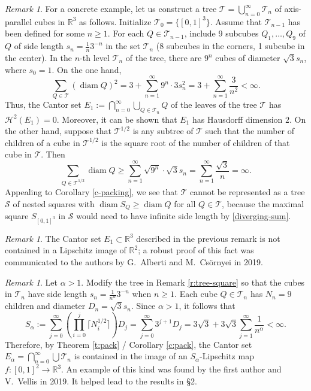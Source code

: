 \documentclass[12pt]{amsart}
\theoremstyle{definition}
\theoremstyle{remark}
\newtheorem{remark}[theorem]{Remark}
\newcommand{\RR}{\mathbb{R}}
\newcommand{\Haus}{\mathcal{H}}
\newcommand{\diam}{\mathop\mathrm{diam}\nolimits}
\numberwithin{figure}{section}
\numberwithin{equation}{section}
\begin{document}
\begin{remark}
For a concrete example, let us construct a tree $\mathcal{T}=\bigcup_{n=0}^\infty\mathcal{T}_n$ of axis-parallel cubes in $\RR^3$ as follows. Initialize $\mathcal{T}_0=\{[0,1]^3\}$. Assume that $\mathcal{T}_{n-1}$ has been defined for some $n\geq 1$. For each $Q\in\mathcal{T}_{n-1}$, include 9 subcubes $Q_1,\dots, Q_9$ of $Q$ of side length $s_n=\frac{1}{n}3^{-n}$ in the set $\mathcal{T}_n$ (8 subcubes in the corners, 1 subcube in the center). In the $n$-th level $\mathcal{T}_n$ of the tree, there are $9^n$ cubes of diameter $\sqrt{3}s_n$, where $s_0=1$. On the one hand, \begin{equation}\sum_{Q\in\mathcal{T}}(\diam Q)^2 = 3+\sum_{n=1}^\infty 9^n\cdot 3s_n^2=3+\sum_{n=1}^\infty\frac{3}{n^2}<\infty.\end{equation} Thus, the Cantor set $E_1:=\bigcap_{n=0}^\infty \bigcup_{Q\in\mathcal{T}_n}Q$ of the leaves of the tree $\mathcal{T}$ has $\Haus^2(E_1)=0$. Moreover, it can be shown that $E_1$ has Hausdorff dimension $2$. On the other hand, suppose that $\mathcal{T}^{1/2}$ is any subtree of $\mathcal{T}$ such that the number of children of a cube in $\mathcal{T}^{1/2}$ is the square root of the number of children of that cube in $\mathcal{T}$. Then  \begin{equation}\label{diverging-sum}
\sum_{Q\in\mathcal{T}^{1/2}} \diam Q \geq \sum_{n=1}^\infty \sqrt{9^n}\cdot\sqrt{3} s_{n} = \sum_{n=1}^\infty \frac{\sqrt{3}}{n}=\infty. \end{equation} Appealing to Corollary \ref{c-packing}, we see that $\mathcal{T}$ cannot be represented as a tree $\mathcal{S}$ of nested squares with $\diam S_Q\geq \diam Q$ for all $Q\in\mathcal{T}$, because the maximal square $S_{[0,1]^3}$ in $\mathcal{S}$ would need to have infinite side length by \eqref{diverging-sum}.\end{remark}

\begin{remark}\label{r:alberti-csornyei} The Cantor set $E_1\subset\RR^3$ described in the previous remark is not contained in a Lipschitz image of $\RR^2$; a robust proof of this fact was communicated to the authors by G.~Alberti and M.~Cs\"ornyei in 2019.\end{remark}

\begin{remark}\label{ex:alpha} Let $\alpha>1$. Modify the tree in Remark \ref{r:tree-square} so that the cubes in $\mathcal{T}_n$ have side length $s_n=\frac{1}{n^\alpha}3^{-n}$ when $n\geq 1$. Each cube $Q\in\mathcal{T}_n$ has $N_n=9$ children and diameter $D_n=\sqrt{3}s_n$. Since $\alpha>1$, it follows that \begin{equation}S_\alpha:=\sum_{j=0}^\infty \left(\prod_{i=0}^{j} \lceil N_i^{1/2}\rceil \right) D_j= \sum_{j=0}^\infty 3^{j+1}D_j=3\sqrt{3}+3\sqrt{3}\sum_{j=1}^\infty \frac{1}{n^{\alpha}}<\infty.\end{equation} Therefore, by Theorem \ref{t:pack} / Corollary \ref{c:pack}, the Cantor set $E_\alpha=\bigcap_{n=0}^\infty \bigcup\mathcal{T}_n$ is contained in the image of an $S_\alpha$-Lipschitz map $f:[0,1]^2\rightarrow\RR^3$. An example of this kind was found by the first author and V.~Vellis in 2019. It helped lead to the results in \S2.\end{remark}
\end{document}
